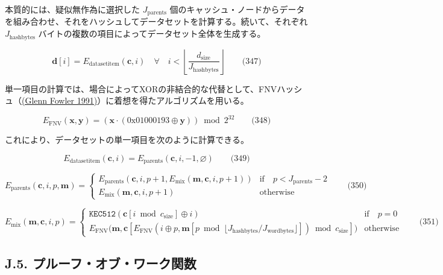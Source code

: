 \documentclass[
]{ltjsarticle}
\begin{document}
本質的には、疑似無作為に選択した \(J_{\mathrm{parents}}\)
個のキャッシュ・ノードからデータを組み合わせ、それをハッシュしてデータセットを計算する。続いて、それぞれ
\(J_{\mathrm{hashbytes}}\)
バイトの複数の項目によってデータセット全体を生成する。

\protect\hypertarget{eq-347}{}{}

\[\mathbf{d}[i] = E_{\mathrm{datasetitem}}(\mathbf{c}, i) \quad \forall \quad i < \left\lfloor\frac{d_{\mathrm{size}}}{J_{\mathrm{hashbytes}}}\right\rfloor \qquad \text{(347)}\]

単一項目の計算では、場合によってXORの非結合的な代替として、FNVハッシュ（\protect\hyperlink{ref-FowlerNollVo1991FNVHash}{(Glenn
Fowler 1991)}）に着想を得たアルゴリズムを用いる。

\protect\hypertarget{eq-348}{}{}

\[E_\text{FNV}(\mathbf{x}, \mathbf{y}) = (\mathbf{x} \cdot (\mathrm{0x01000193} \oplus \mathbf{y})) \bmod 2^{32} \qquad \text{(348)}\]

これにより、データセットの単一項目を次のように計算できる。

\protect\hypertarget{eq-349}{}{}

\[E_{\mathrm{datasetitem}}(\mathbf{c}, i) = E_{\mathrm{parents}}(\mathbf{c}, i, -1, \varnothing) \qquad \text{(349)}\]

\protect\hypertarget{eq-350}{}{}

\[E_{\mathrm{parents}}(\mathbf{c}, i, p, \mathbf{m}) = \begin{cases}
E_{\mathrm{parents}}(\mathbf{c}, i, p +1, E_{\mathrm{mix}}(\mathbf{m}, \mathbf{c}, i, p + 1)) & \text{if} \quad p < J_{\mathrm{parents}} -2 \\
E_{\mathrm{mix}}(\mathbf{m}, \mathbf{c}, i, p + 1) & \text{otherwise}
\end{cases} \qquad \text{(350)}\]

\protect\hypertarget{eq-351}{}{}

\[E_{\mathrm{mix}}(\mathbf{m}, \mathbf{c}, i, p) = \begin{cases}
\texttt{KEC512}(\mathbf{c}[i \bmod c_\mathrm{{size}}] \oplus i) & \text{if} \quad p = 0 \\
E_\text{FNV}\big(\mathbf{m}, \mathbf{c}[E_\text{FNV}(i \oplus p, \mathbf{m}[p \bmod \lfloor J_{\mathrm{hashbytes}} / J_{\mathrm{wordbytes}} \rfloor]) \bmod c_{\mathrm{size}}] \big) & \text{otherwise}
\end{cases} \qquad \text{(351)}\]

\hypertarget{j.5.-ux30d7ux30ebux30fcux30d5ux30aaux30d6ux30efux30fcux30afux95a2ux6570}{%
\subsection{J.5.
プルーフ・オブ・ワーク関数}\label{j.5.-ux30d7ux30ebux30fcux30d5ux30aaux30d6ux30efux30fcux30afux95a2ux6570}}
\end{document}
